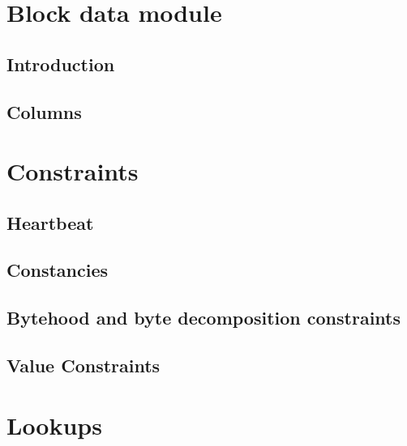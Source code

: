 \section{Block data module}
\subsection{Introduction}                                   \label{block data: intro}                 
\subsection{Columns}                                        \label{block data: columns}               

\section{Constraints}
\subsection{Heartbeat}                                      \label{block data: heartbeat}             
\subsection{Constancies}                                    \label{block data: constancies}           
\subsection{Bytehood and byte decomposition constraints}    \label{block data: byte decomposition}    
\subsection{Value Constraints}                              \label{block data: value constraints}     

\section{Lookups}                                           \label{block data: lookups}               

	
